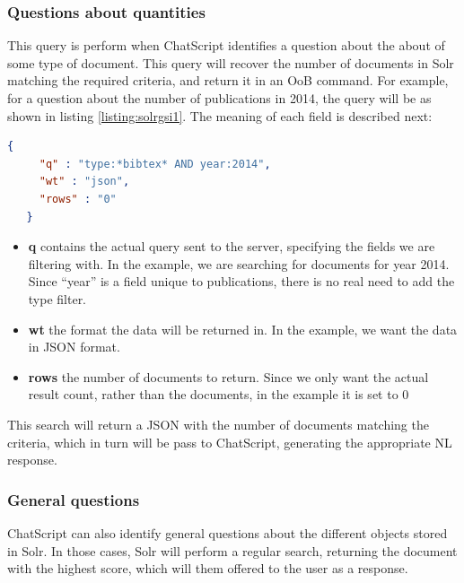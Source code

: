 \subsubsection{Questions about quantities}

This query is perform when ChatScript identifies a question about the about of some type of document. This query will recover the number of documents in Solr matching the required criteria, and return it in an \ac{OoB} command. For example, for a question about the number of publications in 2014, the query will be as shown in listing \ref{listing:solrgsi1}. The meaning of each field is described next:

\begin{center} 
  \begin{lstlisting}[language=json, caption=Example JSON query for Solr, label=listing:solrgsi1]
   {
     "q" : "type:*bibtex* AND year:2014",
     "wt" : "json",
     "rows" : "0"
   }  
  \end{lstlisting}
\end{center}

\begin{itemize}
  \item \textbf{q} contains the actual query sent to the server, specifying the fields we are filtering with. In the example, we are searching for documents for year 2014. Since ``year'' is a field unique to publications, there is no real need to add the type filter.
  \item \textbf{wt} the format the data will be returned in. In the example, we want the data in JSON format.
  \item \textbf{rows} the number of documents to return. Since we only want the actual result count, rather than the documents, in the example it is set to 0
\end{itemize}

This search will return a JSON with the number of documents matching the criteria, which in turn will be pass to ChatScript, generating the appropriate \ac{NL} response.

\subsubsection{General questions}

ChatScript can also identify general questions about the different objects stored in Solr. In those cases, Solr will perform a regular search, returning the document with the highest score, which will them offered to the user as a response.

